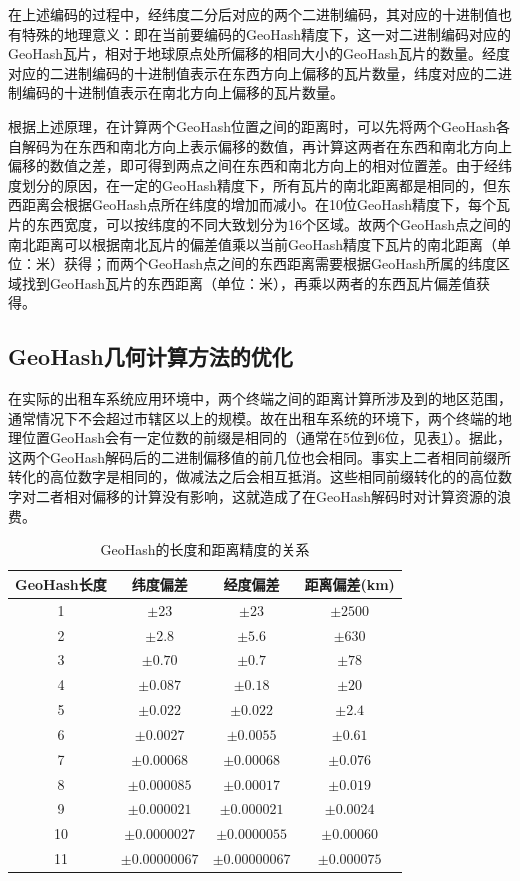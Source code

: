 在上述编码的过程中，经纬度二分后对应的两个二进制编码，其对应的十进制值也有特殊的地理意义：即在当前要编码的GeoHash精度下，这一对二进制编码对应的GeoHash瓦片，相对于地球原点处所偏移的相同大小的GeoHash瓦片的数量。经度对应的二进制编码的十进制值表示在东西方向上偏移的瓦片数量，纬度对应的二进制编码的十进制值表示在南北方向上偏移的瓦片数量。\par

根据上述原理，在计算两个GeoHash位置之间的距离时，可以先将两个GeoHash各自解码为在东西和南北方向上表示偏移的数值，再计算这两者在东西和南北方向上偏移的数值之差，即可得到两点之间在东西和南北方向上的相对位置差。由于经纬度划分的原因，在一定的GeoHash精度下，所有瓦片的南北距离都是相同的，但东西距离会根据GeoHash点所在纬度的增加而减小。在10位GeoHash精度下，每个瓦片的东西宽度，可以按纬度的不同大致划分为16个区域。故两个GeoHash点之间的南北距离可以根据南北瓦片的偏差值乘以当前GeoHash精度下瓦片的南北距离（单位：米）获得；而两个GeoHash点之间的东西距离需要根据GeoHash所属的纬度区域找到GeoHash瓦片的东西距离（单位：米），再乘以两者的东西瓦片偏差值获得。\par

\subsection{GeoHash几何计算方法的优化}
在实际的出租车系统应用环境中，两个终端之间的距离计算所涉及到的地区范围，通常情况下不会超过市辖区以上的规模。故在出租车系统的环境下，两个终端的地理位置GeoHash会有一定位数的前缀是相同的（通常在5位到6位，见表\ref{tab:GeoHashScale}）。据此，这两个GeoHash解码后的二进制偏移值的前几位也会相同。事实上二者相同前缀所转化的高位数字是相同的，做减法之后会相互抵消。这些相同前缀转化的的高位数字对二者相对偏移的计算没有影响，这就造成了在GeoHash解码时对计算资源的浪费。\par

\begin{table}
  \centering
  \caption{GeoHash的长度和距离精度的关系}\label{tab:GeoHashScale}
  \begin{tabular*}{0.9\textwidth}{@{\extracolsep{\fill}}cccc}
  \toprule
    GeoHash长度    &纬度偏差 &经度偏差 &距离偏差(km) \\
  \midrule
    1    &$\pm23$ &$\pm23$ &$\pm2500$\\
    2    &$\pm2.8$ &$\pm5.6$ &$\pm630$\\
    3    &$\pm0.70$ &$\pm0.7$ &$\pm78$\\
    4    &$\pm0.087$ &$\pm0.18$ &$\pm20$\\
    5    &$\pm0.022$ &$\pm0.022$ &$\pm2.4$\\
    6    &$\pm0.0027$ &$\pm0.0055$ &$\pm0.61$\\
    7    &$\pm0.00068$ &$\pm0.00068$ &$\pm0.076$\\
    8    &$\pm0.000085$ &$\pm0.00017$ &$\pm0.019$\\
    9    &$\pm0.000021$ &$\pm0.000021$ &$\pm0.0024$\\
    10    &$\pm0.0000027$ &$\pm0.0000055$ &$\pm0.00060$\\
    11    &$\pm0.00000067$ &$\pm0.00000067$ &$\pm0.000075$\\
  \bottomrule
  \end{tabular*}
\end{table}

